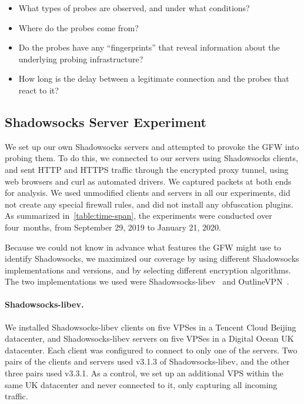 \documentclass[sigconf,letterpaper]{acmart}
\begin{document}
\begin{itemize}
    \item What types of probes are observed, and under what conditions?
    \item Where do the probes come from?
    \item Do the probes have any ``fingerprints'' that reveal information about the underlying probing infrastructure?
    \item How long is the delay between a legitimate connection and the probes that react to it?
\end{itemize}

\subsection{Shadowsocks Server Experiment}
\label{sec:shadowsocks-server-experiment}

We set up our own Shadowsocks servers
and attempted to provoke the GFW into probing them.
To do this, we connected to our servers using Shadowsocks clients,
and sent HTTP and HTTPS traffic through the encrypted proxy tunnel,
using web browsers and curl as automated drivers.
We captured packets at both ends for analysis.
We used unmodified clients and servers in all our experiments,
did not create any special firewall rules,
and did not install any obfuscation plugins.
As summarized in~\autoref{table:time-span},
the experiments were conducted over four~months, from September 29, 2019 to January 21, 2020.

Because we could not know in advance
what features the GFW might use to identify Shadowsocks,
we maximized our coverage by using different Shadowsocks implementations and versions,
and by selecting different encryption algorithms.
The two implementations we used were
Shadowsocks-libev~\cite{shadowsocks-libev} and OutlineVPN~\cite{outline}.

\paragraph{Shadowsocks-libev.}
We installed Shadowsocks-libev clients on five VPSes in a Tencent Cloud Beijing datacenter,
and Shadowsocks-libev servers on five VPSes in a Digital Ocean UK datacenter.
Each client was configured to connect to only one of the servers.
Two pairs of the clients and servers used v3.1.3 of Shadowsocks-libev, and the other three pairs used v3.3.1.
As a control, we set up an additional VPS within the same UK datacenter
and never connected to it,
only capturing all incoming traffic.
\end{document}

